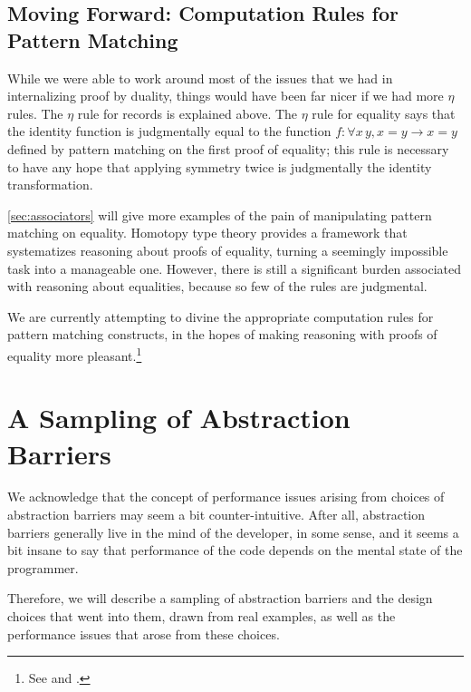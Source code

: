   \subsection{Moving Forward: Computation Rules for Pattern Matching} \label{sec:compute-match}
    While we were able to work around most of the issues that we had in internalizing proof by duality, things would have been far nicer if we had more $\eta$ rules.
    The $\eta$ rule for records is explained above.
    The $\eta$ rule for equality says that the identity function is judgmentally equal to the function $f : \forall x\, y, x = y \to x = y$ defined by pattern matching on the first proof of equality; this rule is necessary to have any hope that applying symmetry twice is judgmentally the identity transformation.

    \autoref{sec:associators} will give more examples of the pain of manipulating pattern matching on equality.
    Homotopy type theory provides a framework that systematizes reasoning about proofs of equality, turning a seemingly impossible task into a manageable one.
    However, there is still a significant burden associated with reasoning about equalities, because so few of the rules are judgmental.

    We are currently attempting to divine the appropriate computation rules for pattern matching constructs, in the hopes of making reasoning with proofs of equality more pleasant.\footnote{See  and .}

\section{A Sampling of Abstraction Barriers}

We acknowledge that the concept of performance issues arising from choices of abstraction barriers may seem a bit counter-intuitive.
After all, abstraction barriers generally live in the mind of the developer, in some sense, and it seems a bit insane to say that performance of the code depends on the mental state of the programmer.

Therefore, we will describe a sampling of abstraction barriers and the design choices that went into them, drawn from real examples, as well as the performance issues that arose from these choices.

